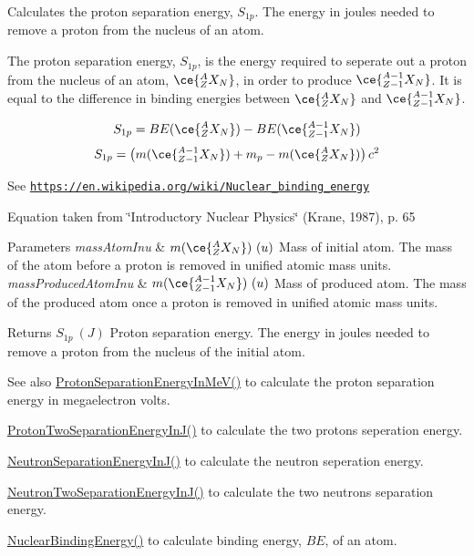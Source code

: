 Calculates the proton separation energy, $S_{1p}$. The energy in joules needed to remove a proton from the nucleus of an atom. 

The proton separation energy, $S_{1p}$, is the energy required to seperate out a proton from the nucleus of an atom, $\ce{ ^{A}_{Z}X_{N} }$, in order to produce $\ce{ ^{A-1}_{Z-1}X_{N} }$. It is equal to the difference in binding energies between $\ce{ ^{A}_{Z}X_{N} }$ and $\ce{ ^{A-1}_{Z-1}X_{N} }$.

\[S_{1p} = BE(\ce{ ^{A}_{Z}X_{N} }) - BE(\ce{ ^{A-1}_{Z-1}X_{N} })\] \[S_{1p} = \left ( m(\ce{ ^{A-1}_{Z-1}X_{N} }) + m_p - m(\ce{ ^{A}_{Z}X_{N} }) \right ) c^2\]

See \href{https://en.wikipedia.org/wiki/Nuclear_binding_energy}{\tt https\+://en.\+wikipedia.\+org/wiki/\+Nuclear\+\_\+binding\+\_\+energy}

Equation taken from \char`\"{}\+Introductory Nuclear Physics\char`\"{} (Krane, 1987), p. 65


\begin{DoxyParams}{Parameters}
{\em mass\+Atom\+Inu} & $m(\ce{ ^{A}_{Z}X_{N} })\ (u)$ Mass of initial atom. The mass of the atom before a proton is removed in unified atomic mass units. \\
\hline
{\em mass\+Produced\+Atom\+Inu} & $m(\ce{ ^{A-1}_{Z-1}X_{N} })\ (u)$ Mass of produced atom. The mass of the produced atom once a proton is removed in unified atomic mass units. \\
\hline
\end{DoxyParams}
\begin{DoxyReturn}{Returns}
$S_{1p}\ (J)$ Proton separation energy. The energy in joules needed to remove a proton from the nucleus of the initial atom. 
\end{DoxyReturn}
\begin{DoxySeeAlso}{See also}
\hyperlink{group___nuclear_separation_energy_ga6a619ded55c47ed22ea2d8a85202ebeb}{Proton\+Separation\+Energy\+In\+Me\+V()} to calculate the proton separation energy in megaelectron volts. 

\hyperlink{group___nuclear_separation_energy_gad7c1d4a32daa8aaa53c5fce37c421f82}{Proton\+Two\+Separation\+Energy\+In\+J()} to calculate the two protons seperation energy. 

\hyperlink{group___nuclear_separation_energy_ga14a4bb972ae000ef4ff35f2734ff22d0}{Neutron\+Separation\+Energy\+In\+J()} to calculate the neutron seperation energy. 

\hyperlink{group___nuclear_separation_energy_ga293ac9428420a0adf4235048dbe529b4}{Neutron\+Two\+Separation\+Energy\+In\+J()} to calculate the two neutrons separation energy. 

\hyperlink{group___nuclear_binding_energy_gafea41a3c21704414394c3204b35aba98}{Nuclear\+Binding\+Energy()} to calculate binding energy, $BE$, of an atom. 
\end{DoxySeeAlso}
\mbox{\label{group___nuclear_separation_energy_ga6a619ded55c47ed22ea2d8a85202ebeb}} 
